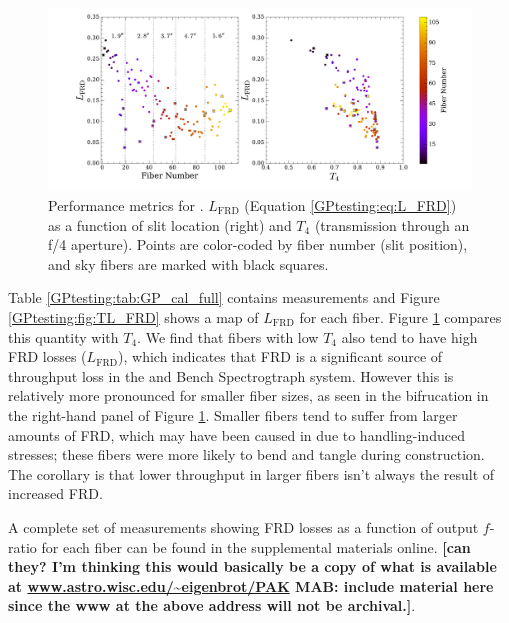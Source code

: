 \begin{figure}
  \centering
  \includegraphics[width=\textwidth]{Appendix/figs/gradpak_Lplots.pdf}
  \caption[\GP on-bench FRD
  losses]{\label{GPtesting:fig:FRD_loss}\fixspacing Performance
    metrics for \GP. $L_\mathrm{FRD}$ (Equation
    \ref{GPtesting:eq:L_FRD}) as a function of slit location (right)
    and $T_4$ (transmission through an f/4 aperture). Points are
    color-coded by fiber number (slit position), and sky fibers are
    marked with black squares.}
\end{figure}

Table \ref{GPtesting:tab:GP_cal_full} contains measurements and Figure
\ref{GPtesting:fig:TL_FRD} shows a map of $L_\mathrm{FRD}$ for each
\GP fiber. Figure \ref{GPtesting:fig:FRD_loss} compares this quantity
with $T_4$. We find that fibers with low $T_4$ also tend to have high
FRD losses ($L_\mathrm{FRD}$), which indicates that FRD is a
significant source of throughput loss in the \GP and Bench
Spectrogtraph system.  However this is relatively more pronounced for
smaller fiber sizes, as seen in the bifrucation in the right-hand
panel of Figure \ref{GPtesting:fig:FRD_loss}. Smaller fibers tend to
suffer from larger amounts of FRD, which may have been caused in \GP
due to handling-induced stresses; these fibers were more likely to
bend and tangle during construction.  The corollary is that lower
throughput in larger fibers isn't always the result of increased FRD.

A complete set of measurements showing FRD losses as a function of
output $f$-ratio for each fiber can be found in the supplemental
materials online. {\bf [can they? I'm thinking this would basically be
    a copy of what is available at
    \url{www.astro.wisc.edu/~eigenbrot/PAK} MAB: include material here
    since the www at the above address will not be archival.]}.

% 




